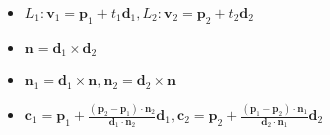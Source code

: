 \begin{itemize}[nosep]
  \item $L_1: \boldsymbol{v}_1 = \boldsymbol{p}_1 + t_1\boldsymbol{d}_1, L_2: \boldsymbol{v}_2 = \boldsymbol{p}_2 + t_2\boldsymbol{d}_2$
  \item $\boldsymbol{n} = \boldsymbol{d}_1\times \boldsymbol{d}_2$
  \item $\boldsymbol{n}_1 = \boldsymbol{d}_1 \times \boldsymbol{n}, \boldsymbol{n}_2 = \boldsymbol{d}_2 \times \boldsymbol{n}$
  \item
    $\boldsymbol{c}_1 = \boldsymbol{p}_1 + \frac{(\boldsymbol{p}_2 - \boldsymbol{p}_1)\cdot\boldsymbol{n}_2}{\boldsymbol{d}_1\cdot\boldsymbol{n}_2}\boldsymbol{d}_1,
  \boldsymbol{c}_2 = \boldsymbol{p}_2 + \frac{(\boldsymbol{p}_1 - \boldsymbol{p}_2)\cdot\boldsymbol{n}_1}{\boldsymbol{d}_2\cdot\boldsymbol{n}_1}\boldsymbol{d}_2$
  \\
\end{itemize}
